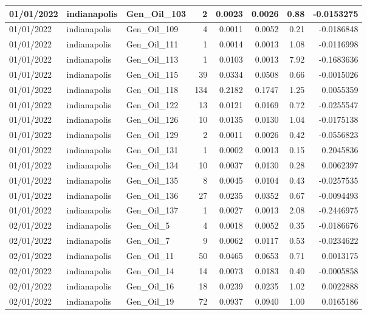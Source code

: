 \documentclass[
  letterpaper,
  DIV=11,
  numbers=noendperiod]{scrartcl}
\begin{document}
\begin{tabular}{l|l|l|r|r|r|r|r}
\hline
01/01/2022 & indianapolis & Gen\_Oil\_103 & 2 & 0.0023 & 0.0026 & 0.88 & -0.0153275\\
\hline
01/01/2022 & indianapolis & Gen\_Oil\_109 & 4 & 0.0011 & 0.0052 & 0.21 & -0.0186848\\
\hline
01/01/2022 & indianapolis & Gen\_Oil\_111 & 1 & 0.0014 & 0.0013 & 1.08 & -0.0116998\\
\hline
01/01/2022 & indianapolis & Gen\_Oil\_113 & 1 & 0.0103 & 0.0013 & 7.92 & -0.1683636\\
\hline
01/01/2022 & indianapolis & Gen\_Oil\_115 & 39 & 0.0334 & 0.0508 & 0.66 & -0.0015026\\
\hline
01/01/2022 & indianapolis & Gen\_Oil\_118 & 134 & 0.2182 & 0.1747 & 1.25 & 0.0055359\\
\hline
01/01/2022 & indianapolis & Gen\_Oil\_122 & 13 & 0.0121 & 0.0169 & 0.72 & -0.0255547\\
\hline
01/01/2022 & indianapolis & Gen\_Oil\_126 & 10 & 0.0135 & 0.0130 & 1.04 & -0.0175138\\
\hline
01/01/2022 & indianapolis & Gen\_Oil\_129 & 2 & 0.0011 & 0.0026 & 0.42 & -0.0556823\\
\hline
01/01/2022 & indianapolis & Gen\_Oil\_131 & 1 & 0.0002 & 0.0013 & 0.15 & 0.2045836\\
\hline
01/01/2022 & indianapolis & Gen\_Oil\_134 & 10 & 0.0037 & 0.0130 & 0.28 & 0.0062397\\
\hline
01/01/2022 & indianapolis & Gen\_Oil\_135 & 8 & 0.0045 & 0.0104 & 0.43 & -0.0257535\\
\hline
01/01/2022 & indianapolis & Gen\_Oil\_136 & 27 & 0.0235 & 0.0352 & 0.67 & -0.0094493\\
\hline
01/01/2022 & indianapolis & Gen\_Oil\_137 & 1 & 0.0027 & 0.0013 & 2.08 & -0.2446975\\
\hline
02/01/2022 & indianapolis & Gen\_Oil\_5 & 4 & 0.0018 & 0.0052 & 0.35 & -0.0186676\\
\hline
02/01/2022 & indianapolis & Gen\_Oil\_7 & 9 & 0.0062 & 0.0117 & 0.53 & -0.0234622\\
\hline
02/01/2022 & indianapolis & Gen\_Oil\_11 & 50 & 0.0465 & 0.0653 & 0.71 & 0.0013175\\
\hline
02/01/2022 & indianapolis & Gen\_Oil\_14 & 14 & 0.0073 & 0.0183 & 0.40 & -0.0005858\\
\hline
02/01/2022 & indianapolis & Gen\_Oil\_16 & 18 & 0.0239 & 0.0235 & 1.02 & 0.0022888\\
\hline
02/01/2022 & indianapolis & Gen\_Oil\_19 & 72 & 0.0937 & 0.0940 & 1.00 & 0.0165186\\

\end{tabular}
\end{document}
